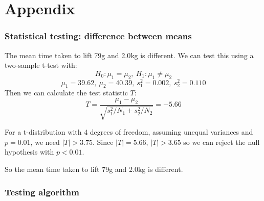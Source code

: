 \documentclass{beamer}
\begin{document}
\section{Appendix}
\begin{frame}
  \frametitle{Statistical testing: difference between means}
  The mean time taken to lift 79g and 2.0kg is different. We can test this using a two-sample t-test with:
  $$H_0: \mu_1 = \mu_2,\ H_1: \mu_1 \neq \mu_2 $$
  $$ \mu_1 = 39.62,\ \mu_2 = 40.39,\ s^2_1 = 0.002,\ s^2_2 = 0.110$$
  Then we can calculate the test statistic $T$:
  $$T = \frac{\mu_1 - \mu_2}{\sqrt{s^2_1 / N_1 + s^2_2 / N_2}} = -5.66$$

  For a t-distribution with 4 degrees of freedom, assuming unequal variances and $p = 0.01$, we need $|T| > 3.75$. Since $|T| = 5.66$, $|T| > 3.65$ so we can reject the null hypothesis with $p < 0.01$.

  So the mean time taken to lift 79g and 2.0kg is different. 
\end{frame}

\begin{frame}
  \frametitle{Testing algorithm}
  \begin{algorithm}[H]
  \end{algorithm}
\end{frame}
\end{document}
